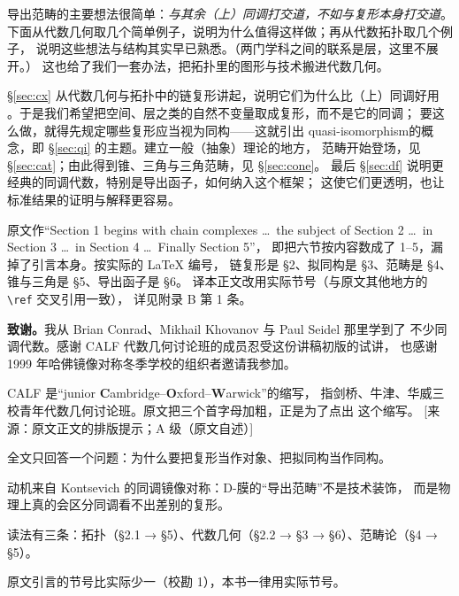 导出范畴的主要想法很简单：\emph{与其余（上）同调打交道，不如与复形本身打交道}。
下面从代数几何取几个简单例子，说明为什么值得这样做；再从代数拓扑取几个例子，
说明这些想法与结构其实早已熟悉。（两门学科之间的联系是层，这里不展开。）
这也给了我们一套办法，把拓扑里的图形与技术搬进代数几何。

§\ref{sec:cx} 从代数几何与拓扑中的链复形讲起，说明它们为什么比（上）同调好用
。于是我们希望把空间、层之类的自然不变量取成复形，而不是它的同调；
要这么做，就得先规定哪些复形应当视为同构——这就引出
{quasi-isomorphism}的概念，即 §\ref{sec:qi} 的主题。建立一般（抽象）理论的地方，
范畴开始登场，见 §\ref{sec:cat}；由此得到锥、三角与三角范畴，见 §\ref{sec:cone}。
最后 §\ref{sec:df} 说明更经典的同调代数，特别是导出函子，如何纳入这个框架；
这使它们更透明，也让标准结果的证明与解释更容易。

\begin{kanwu}[引言中的节号错位]
原文作“Section 1 begins with chain complexes \ldots\ the subject of Section 2
\ldots\ in Section 3 \ldots\ in Section 4 \ldots\ Finally Section 5”，
即把六节按内容数成了 1--5，漏掉了引言本身。按实际的 \LaTeX{} 编号，
链复形是 §2、拟同构是 §3、范畴是 §4、锥与三角是 §5、导出函子是 §6。
译本正文改用实际节号（与原文其他地方的 \verb|\ref| 交叉引用一致），
详见附录 B 第 1 条。
\end{kanwu}

\textbf{致谢。}我从 Brian Conrad、Mikhail Khovanov 与 Paul Seidel 那里学到了
不少同调代数。感谢 CALF 代数几何讨论班的成员忍受这份讲稿初版的试讲，
也感谢 1999 年哈佛镜像对称冬季学校的组织者邀请我参加。

\begin{yizhu}[CALF]
CALF 是“junior \textbf{C}ambridge--\textbf{O}xford--\textbf{W}arwick”的缩写，
指剑桥、牛津、华威三校青年代数几何讨论班。原文把三个首字母加粗，正是为了点出
这个缩写。
[来源：原文正文的排版提示；A 级（原文自述）]
\end{yizhu}

\begin{keytakeaways}
  \item 全文只回答一个问题：为什么要把复形当作对象、把拟同构当作同构。
  \item 动机来自 Kontsevich 的同调镜像对称：D-膜的“导出范畴”不是技术装饰，
        而是物理上真的会区分同调看不出差别的复形。
  \item 读法有三条：拓扑（§2.1 → §5）、代数几何（§2.2 → §3 → §6）、范畴论（§4 → §5）。
  \item 原文引言的节号比实际少一（校勘 1），本书一律用实际节号。
\end{keytakeaways}
